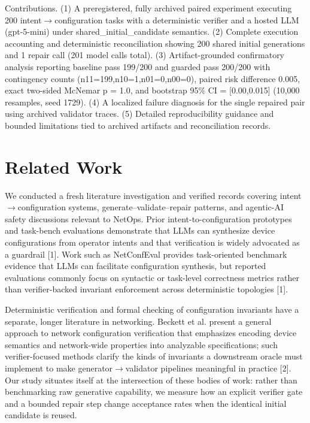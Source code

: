 \documentclass[conference]{IEEEtran}
\begin{document}
Contributions. (1) A preregistered, fully archived paired experiment executing 200 intent\ensuremath{\rightarrow}configuration tasks with a deterministic verifier and a hosted LLM (gpt-5-mini) under shared\_initial\_candidate semantics. (2) Complete execution accounting and deterministic reconciliation showing 200 shared initial generations and 1 repair call (201 model calls total). (3) Artifact-grounded confirmatory analysis reporting baseline pass 199/200 and guarded pass 200/200 with contingency counts (n11=199,n10=1,n01=0,n00=0), paired risk difference 0.005, exact two-sided McNemar p = 1.0, and bootstrap 95\% CI = [0.00,0.015] (10,000 resamples, seed 1729). (4) A localized failure diagnosis for the single repaired pair using archived validator traces. (5) Detailed reproducibility guidance and bounded limitations tied to archived artifacts and reconciliation records.

\section{Related Work}
We conducted a fresh literature investigation and verified records covering intent\ensuremath{\rightarrow}configuration systems, generate--validate--repair patterns, and agentic-AI safety discussions relevant to NetOps. Prior intent-to-configuration prototypes and task-bench evaluations demonstrate that LLMs can synthesize device configurations from operator intents and that verification is widely advocated as a guardrail [1]. Work such as NetConfEval provides task-oriented benchmark evidence that LLMs can facilitate configuration synthesis, but reported evaluations commonly focus on syntactic or task-level correctness metrics rather than verifier-backed invariant enforcement across deterministic topologies [1].

Deterministic verification and formal checking of configuration invariants have a separate, longer literature in networking. Beckett et al. present a general approach to network configuration verification that emphasizes encoding device semantics and network-wide properties into analyzable specifications; such verifier-focused methods clarify the kinds of invariants a downstream oracle must implement to make generator\ensuremath{\rightarrow}validator pipelines meaningful in practice [2]. Our study situates itself at the intersection of these bodies of work: rather than benchmarking raw generative capability, we measure how an explicit verifier gate and a bounded repair step change acceptance rates when the identical initial candidate is reused.
\end{document}
